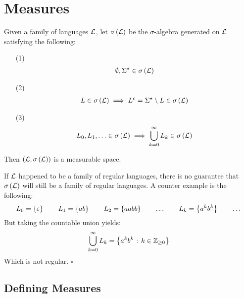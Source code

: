\section{Measures}
Given a family of languages \(\mathcal{L}\),
let \(\sigma\left(\mathcal{L}\right)\) be the \(\sigma\)-algebra generated on
\(\mathcal{L}\) satisfying the following:

\begin{enumerate}
  \item[(1)]
    \begin{align*}
      \emptyset, \Sigma^\star \in \sigma\left(\mathcal{L}\right)
    \end{align*}

  \item[(2)]
    \begin{align*}
      L \in \sigma\left(\mathcal{L}\right)
        \implies
          L^c = \Sigma^\star \setminus L \in \sigma\left(\mathcal{L}\right)
    \end{align*}

  \item[(3)]
    \begin{align*}
      L_0, L_1, \ldots \in \sigma\left(\mathcal{L}\right)
        \implies
          \bigcup_{k = 0}^{\infty} L_k \in \sigma\left(\mathcal{L}\right)
    \end{align*}

\end{enumerate}

Then \(\left(\mathcal{L}, \sigma\left(\mathcal{L}\right)\right)\) is a measurable space.

\begin{remark}
If \(\mathcal{L}\) happened to be a family of regular languages,
there is no guarantee that \(\sigma\left(\mathcal{L}\right)\)
will still be a family of regular languages.
A counter example is the following:
\begin{align*}
  L_0 = \left\{\varepsilon\right\}
  \qquad
  L_1 = \left\{ab\right\}
  \qquad
  L_2 = \left\{aabb\right\}
  \qquad
  \ldots
  \qquad
  L_k = \left\{a^k b^k\right\}
  \qquad
  \ldots
\end{align*}
But taking the countable union yields:
\begin{align*}
  \bigcup_{k = 0}^{\infty} L_k = \left\{a^k b^k \ \colon k \in \mathbb{Z}_{\geq 0}\right\}
\end{align*}
Which is not regular.
\hfill\(\square\)
\end{remark}


\subsection{Defining Measures}

